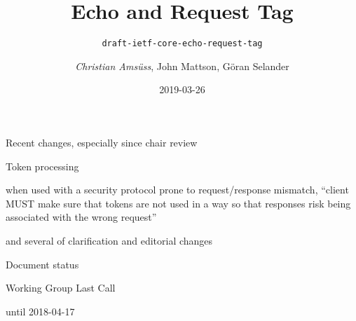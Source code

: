 \documentclass{beamer}
\title{Echo and Request Tag}
\subtitle{\texttt{draft-ietf-core-echo-request-tag}}
\author{\textit{Christian Amsüss}, John Mattson, Göran Selander}
\date{2019-03-26}
\begin{document}
\frame{\titlepage}

\begin{frame}{Recent changes, especially since chair review}\begin{center}
	\huge Token processing

	\bigskip

	\Large

	when used with a security protocol prone to request/response mismatch,
	“client MUST make sure that tokens are not used in a way so that responses risk being associated with the wrong request”

	\vspace{2cm}

	\small and several of clarification and editorial changes
\end{center}\end{frame}

\begin{frame}{Document status}\begin{center}
	\Huge Working Group Last Call

	\bigskip

	\Large until 2018-04-17
\end{center}\end{frame}
\end{document}
